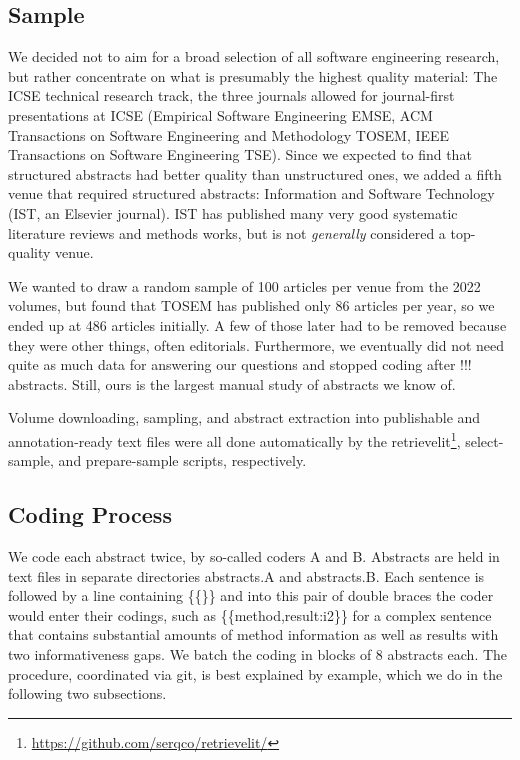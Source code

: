 \documentclass[10pt,journal,compsoc]{IEEEtran}
\newcommand{\Prg}[1]{\bgroup\ttfamily #1\egroup}  %
\begin{document}
\subsection{Sample}\label{meth_sample}

We decided not to aim for a broad selection of all software engineering research,
but rather concentrate on what is presumably the highest quality material:
The ICSE technical research track,
the three journals allowed for journal-first presentations at ICSE
(Empirical Software Engineering EMSE,
ACM Transactions on Software Engineering and Methodology TOSEM,
IEEE Transactions on Software Engineering TSE).
Since we expected to find that structured abstracts had better quality
than unstructured ones, we added a fifth venue that required structured abstracts:
Information and Software Technology (IST, an Elsevier journal).
IST has published many very good systematic literature reviews and methods works,
but is not \emph{generally} considered a top-quality venue.

We wanted to draw a random sample of 100 articles per venue from the
2022 volumes, but found that TOSEM has published only 86 articles per year,
so we ended up at 486 articles initially.
A few of those later had to be removed because they were other things,
often editorials.
Furthermore, we eventually did not need quite as much data for answering our
questions and stopped coding after !!! abstracts.
Still, ours is the largest manual study of abstracts we know of.

Volume downloading, sampling, and abstract extraction into publishable
and annotation-ready text files were all done automatically by the
retrievelit\footnote{\url{https://github.com/serqco/retrievelit/}},
select-sample, and prepare-sample scripts, respectively.


\subsection{Coding Process}\label{meth_coding}


We code each abstract twice, by so-called coders A and B.
Abstracts are held in text files in separate directories \Prg{abstracts.A} and \Prg{abstracts.B}.
Each sentence is followed by a line containing \Prg{\{\{\}\}} and into this pair of
double braces the coder would enter their codings,
such as \Prg{\{\{method,result:i2\}\}} for a complex sentence that contains substantial
amounts of method information as well as results with two informativeness gaps.
We batch the coding in blocks of 8 abstracts each.
The procedure, coordinated via git, is best explained by example,
which we do in the following two subsections.
\end{document}

